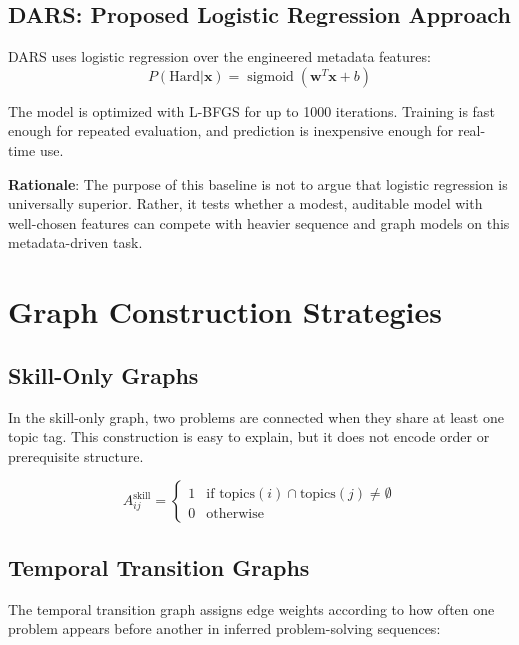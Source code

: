\documentclass[conference]{IEEEtran}
\newcommand{\sigmoid}{\operatorname{sigmoid}}
\begin{document}
\subsection{DARS: Proposed Logistic Regression Approach}

DARS uses logistic regression over the engineered metadata features:
\begin{equation}
P(\text{Hard} | \mathbf{x}) = \sigmoid(\mathbf{w}^T \mathbf{x} + b)
\end{equation}

The model is optimized with L-BFGS for up to 1000 iterations. Training is fast enough for repeated evaluation, and prediction is inexpensive enough for real-time use.

\textbf{Rationale}: The purpose of this baseline is not to argue that logistic regression is universally superior. Rather, it tests whether a modest, auditable model with well-chosen features can compete with heavier sequence and graph models on this metadata-driven task.

\section{Graph Construction Strategies} \label{sec:graphs}

\subsection{Skill-Only Graphs}

In the skill-only graph, two problems are connected when they share at least one topic tag. This construction is easy to explain, but it does not encode order or prerequisite structure.

\begin{equation}
A_{ij}^{\text{skill}} = \begin{cases} 1 & \text{if topics}(i) \cap \text{topics}(j) \neq \emptyset \\ 0 & \text{otherwise} \end{cases}
\end{equation}

\subsection{Temporal Transition Graphs}

The temporal transition graph assigns edge weights according to how often one problem appears before another in inferred problem-solving sequences:
\end{document}
